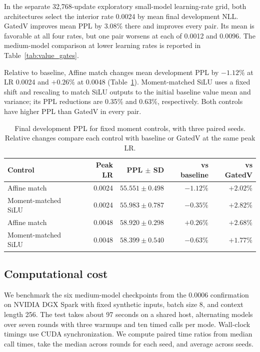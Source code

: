 \documentclass[11pt,a4paper]{article}
\begin{document}
In the separate 32,768-update exploratory small-model learning-rate grid, both architectures select the interior rate 0.0024 by mean final development NLL. GatedV improves mean PPL by 3.08\% there and improves every pair. Its mean is favorable at all four rates, but one pair worsens at each of 0.0012 and 0.0096. The medium-model comparison at lower learning rates is reported in Table~\ref{tab:value_gates}.

Relative to baseline, Affine match changes mean development PPL by $-1.12\%$ at LR 0.0024 and $+0.26\%$ at 0.0048 (Table~\ref{tab:moment}). Moment-matched SiLU uses a fixed shift and rescaling to match SiLU outputs to the initial baseline value mean and variance; its PPL reductions are 0.35\% and 0.63\%, respectively. Both controls have higher PPL than GatedV in every pair.

\begin{table}[t]
\centering\small
\caption{Final development PPL for fixed moment controls, with three paired seeds. Relative changes compare each control with baseline or GatedV at the same peak LR.}
\label{tab:moment}
\begin{tabular}{lrrrr}
\toprule
Control & Peak LR & PPL $\pm$ SD & vs baseline & vs GatedV\\
\midrule
Affine match & 0.0024 & $55.551\pm0.498$ & $-1.12\%$ & $+2.02\%$\\
Moment-matched SiLU & 0.0024 & $55.983\pm0.787$ & $-0.35\%$ & $+2.82\%$\\
Affine match & 0.0048 & $58.920\pm0.298$ & $+0.26\%$ & $+2.68\%$\\
Moment-matched SiLU & 0.0048 & $58.399\pm0.540$ & $-0.63\%$ & $+1.77\%$\\
\bottomrule
\end{tabular}
\end{table}

\subsection{Computational cost}
We benchmark the six medium-model checkpoints from the 0.0006 confirmation on NVIDIA DGX Spark with fixed synthetic inputs, batch size 8, and context length 256. The test takes about 97 seconds on a shared host, alternating models over seven rounds with three warmups and ten timed calls per mode. Wall-clock timings use CUDA synchronization. We compute paired time ratios from median call times, take the median across rounds for each seed, and average across seeds.
\end{document}
